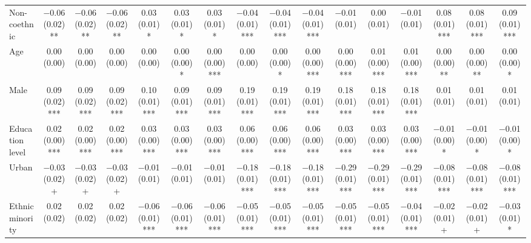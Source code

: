 \begin{table}[H]
\begin{tabular}[t]{lccccccccccccccc}
Non-coethnic & \num{-0.06} (\num{0.02})** & \num{-0.06} (\num{0.02})** & \num{-0.06} (\num{0.02})** & \num{0.03} (\num{0.01})* & \num{0.03} (\num{0.01})* & \num{0.03} (\num{0.01})* & \num{-0.04} (\num{0.01})*** & \num{-0.04} (\num{0.01})*** & \num{-0.04} (\num{0.01})*** & \num{-0.01} (\num{0.01}) & \num{0.00} (\num{0.01}) & \num{-0.01} (\num{0.01}) & \num{0.08} (\num{0.01})*** & \num{0.08} (\num{0.01})*** & \num{0.09} (\num{0.01})***\\
Age & \num{0.00} (\num{0.00}) & \num{0.00} (\num{0.00}) & \num{0.00} (\num{0.00}) & \num{0.00} (\num{0.00}) & \num{0.00} (\num{0.00})* & \num{0.00} (\num{0.00})*** & \num{0.00} (\num{0.00}) & \num{0.00} (\num{0.00})* & \num{0.00} (\num{0.00})*** & \num{0.00} (\num{0.00})*** & \num{0.01} (\num{0.00})*** & \num{0.01} (\num{0.00})*** & \num{0.00} (\num{0.00})** & \num{0.00} (\num{0.00})** & \num{0.00} (\num{0.00})*\\
Male & \num{0.09} (\num{0.02})*** & \num{0.09} (\num{0.02})*** & \num{0.09} (\num{0.02})*** & \num{0.10} (\num{0.01})*** & \num{0.09} (\num{0.01})*** & \num{0.09} (\num{0.01})*** & \num{0.19} (\num{0.01})*** & \num{0.19} (\num{0.01})*** & \num{0.19} (\num{0.01})*** & \num{0.18} (\num{0.01})*** & \num{0.18} (\num{0.01})*** & \num{0.18} (\num{0.01})*** & \num{0.01} (\num{0.01}) & \num{0.01} (\num{0.01}) & \num{0.01} (\num{0.01})\\
Education level & \num{0.02} (\num{0.00})*** & \num{0.02} (\num{0.00})*** & \num{0.02} (\num{0.00})*** & \num{0.03} (\num{0.00})*** & \num{0.03} (\num{0.00})*** & \num{0.03} (\num{0.00})*** & \num{0.06} (\num{0.00})*** & \num{0.06} (\num{0.00})*** & \num{0.06} (\num{0.00})*** & \num{0.03} (\num{0.00})*** & \num{0.03} (\num{0.00})*** & \num{0.03} (\num{0.00})*** & \num{-0.01} (\num{0.00})* & \num{-0.01} (\num{0.00})* & \num{-0.01} (\num{0.00})*\\
Urban & \num{-0.03} (\num{0.02})+ & \num{-0.03} (\num{0.02})+ & \num{-0.03} (\num{0.02})+ & \num{-0.01} (\num{0.01}) & \num{-0.01} (\num{0.01}) & \num{-0.01} (\num{0.01}) & \num{-0.18} (\num{0.01})*** & \num{-0.18} (\num{0.01})*** & \num{-0.18} (\num{0.01})*** & \num{-0.29} (\num{0.01})*** & \num{-0.29} (\num{0.01})*** & \num{-0.29} (\num{0.01})*** & \num{-0.08} (\num{0.01})*** & \num{-0.08} (\num{0.01})*** & \num{-0.08} (\num{0.01})***\\
Ethnic minority & \num{0.02} (\num{0.02}) & \num{0.02} (\num{0.02}) & \num{0.02} (\num{0.02}) & \num{-0.06} (\num{0.01})*** & \num{-0.06} (\num{0.01})*** & \num{-0.06} (\num{0.01})*** & \num{-0.05} (\num{0.01})*** & \num{-0.05} (\num{0.01})*** & \num{-0.05} (\num{0.01})*** & \num{-0.05} (\num{0.01})*** & \num{-0.05} (\num{0.01})*** & \num{-0.04} (\num{0.01})*** & \num{-0.02} (\num{0.01})+ & \num{-0.02} (\num{0.01})+ & \num{-0.03} (\num{0.01})*\\

\end{tabular}
\end{table}
